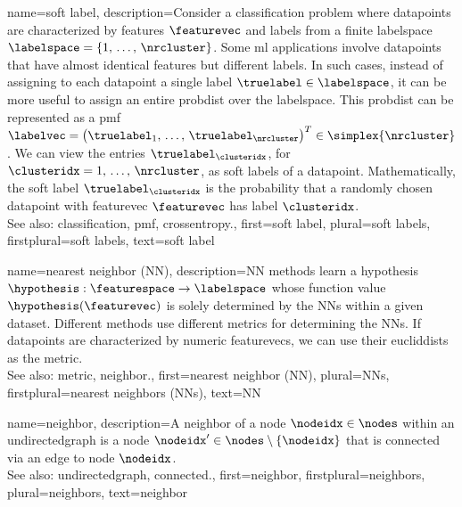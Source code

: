 {name={soft label},
	description={Consider a \gls{classification} problem where \glspl{datapoint} are characterized 
 		by \glspl{feature} $\featurevec$ and \glspl{label} from a finite \gls{labelspace} 
		$\labelspace = \{1,\,\ldots,\,\nrcluster\}$. Some \gls{ml} applications involve \glspl{datapoint} 
		that have almost identical \glspl{feature} but different \glspl{label}. In such 
		cases, instead of assigning to each \gls{datapoint} a single \gls{label} $\truelabel \in \labelspace$, 
		it can be more useful to assign an entire \gls{probdist} over the \gls{labelspace}. 
		This \gls{probdist} can be represented as a \gls{pmf} 
		$\labelvec = \big( \truelabel_{1},\,\ldots,\,\truelabel_{\nrcluster}\big)^{T} \in \simplex{\nrcluster}$. 
		We can view the entries $\truelabel_{\clusteridx}$, for $\clusteridx=1,\,\ldots,\,\nrcluster$, 
		as soft \glspl{label} of a \gls{datapoint}. Mathematically, the soft \gls{label} $\truelabel_{\clusteridx}$  
		is the \gls{probability} that a randomly chosen \gls{datapoint} with \gls{featurevec} $\featurevec$ 
		has \gls{label} $\clusteridx$.
		\\
              	See also: \gls{classification}, \gls{pmf}, \gls{crossentropy}.},
 	first={soft label},
 	plural={soft labels},
 	firstplural={soft labels},
 	text={soft label}
}

{name={nearest neighbor (NN)},
	description={NN methods learn a \gls{hypothesis} 
		$\hypothesis: \featurespace \rightarrow \labelspace$ whose \gls{function} value $\hypothesis(\featurevec)$ 
		is solely determined by the NNs within a given \gls{dataset}. Different 
		methods use different \glspl{metric} for determining the NNs. If \glspl{datapoint} 
		are characterized by numeric \glspl{featurevec}, we can use their \glspl{eucliddist} as 
		the \gls{metric}.
					\\ 
		See also: \gls{metric}, \gls{neighbor}.},
	first={nearest neighbor (NN)},
	plural={NNs},
 	firstplural={nearest neighbors (NNs)},
	text={NN} 
}

{name={neighbor},
	description={A neighbor of a node $\nodeidx \in \nodes$ 
		within an \gls{undirectedgraph} is a node $\nodeidx' \in \nodes \setminus \{ \nodeidx\}$ 
		that is \gls{connected} via an edge to node $\nodeidx$.
				\\ 
		See also: \gls{undirectedgraph}, \gls{connected}.},
	first={neighbor},
	firstplural={neighbors}, 
	plural={neighbors}, 
	text={neighbor} 
}

